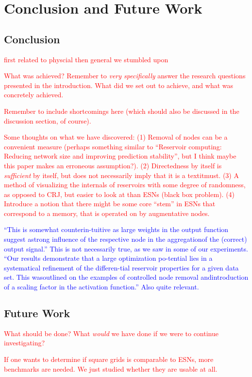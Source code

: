 \chapter{Conclusion and Future Work}

\section{Conclusion}

\textcolor{red}{
  first related to physcial then general we stumbled upon
}

\textcolor{red}{
  What was achieved? Remember to \textit{very specifically} answer the research
questions presented in the introduction. What did we set out to achieve, and
what was concretely achieved.
}

\textcolor{red}{
  Remember to include shortcomings here (which should also be discussed in the
discussion section, of course).
}

\textcolor{red}{
  Some thoughts on what we have discovered: (1) Removal of nodes can be a
convenient measure (perhaps something similar to ``Reservoir computing: Reducing
network size and improving prediction stability'', but I think maybe this paper
makes an erroneous assumption?). (2) Directedness by itself is
\textit{sufficient} by itself, but does not necessarily imply that it is a
textit{must}. (3) A method of visualizing the internals of reservoirs with some
degree of randomness, as opposed to CRJ, but easier to look at than ESNs (black
box problem). (4) Introduce a notion that there might be some core ``stem'' in
ESNs that correspond to a memory, that is operated on by augmentative nodes.
}

\textcolor{blue}{
  ``This is somewhat counterin-tuitive as large weights in the output function
suggest astrong influence of the respective node in the aggregationof the
(correct) output signal.'' This is not necessarily true, as we saw in some of
our experiments. ``Our results demonstrate that a large optimization po-tential
lies in a systematical refinement of the differen-tial reservoir properties for
a given data set.  This wasoutlined on the examples of controlled node removal
andintroduction of a scaling factor in the activation function.'' Also quite
relevant.
}

\section{Future Work}

\textcolor{red}{
  What should be done? What \textit{would} we have done if we were to continue
investigating?
}

\textcolor{red}{
  If one wants to determine if square grids is comparable to ESNs, more
benchmarks are needed. We just studied whether they are usable at all.
}

